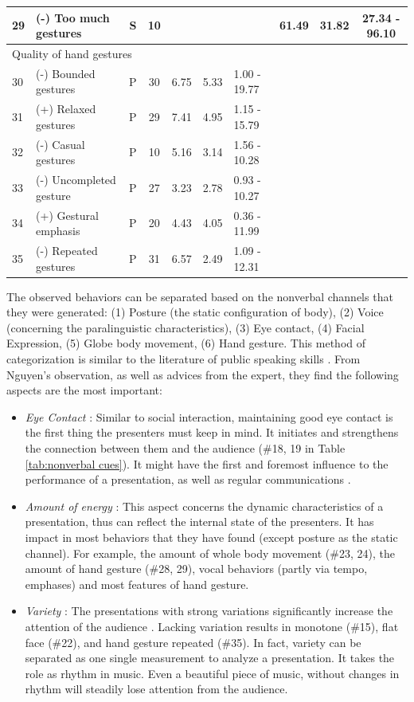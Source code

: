 \begin{table}
{\begin{tabular}{llcclllccc}
29 & (-) Too much gestures & S & 10 &  &  &  & 61.49 & 31.82 & 27.34 - 96.10 \\ \hline
\multicolumn{10}{l}{Quality of hand gestures} \\
30 & (-) Bounded gestures & P & 30 & 6.75 & 5.33 & 1.00 - 19.77 &  &  &  \\
31 & (+) Relaxed gestures & P & 29 & 7.41 & 4.95 & 1.15 - 15.79 &  &  &  \\
32 & (-) Casual gestures & P & 10 & 5.16 & 3.14 & 1.56 - 10.28 &  &  &  \\
33 & (-) Uncompleted gesture & P & 27 & 3.23 & 2.78 & 0.93 - 10.27 &  &  &  \\
34 & (+) Gestural emphasis & P & 20 & 4.43 & 4.05 & 0.36 - 11.99 &  &  &  \\
35 & (-) Repeated gestures & P & 31 & 6.57 & 2.49 & 1.09 - 12.31 &  &  &  \\ \hline
\end{tabular}%
}
\end{table}
\newpage
\par The observed behaviors can be separated based on the nonverbal channels that they were generated: (1) Posture (the static configuration of body), (2) Voice (concerning the paralinguistic characteristics), (3) Eye contact, (4) Facial Expression, (5) Globe body movement, (6) Hand gesture. This method of categorization is similar to the literature of public speaking skills \cite{rodman1996style}. From Nguyen's observation, as well as advices from the expert, they find the following aspects are the most important:

\begin{itemize}
  \item \textit{Eye Contact} : Similar to social interaction, maintaining good eye contact is the first thing the presenters must keep in mind. It initiates and strengthens the connection between them and the audience (\#18, 19 in Table \ref{tab:nonverbal cues}). It might have the first and foremost influence to the performance of a presentation, as well as regular communications \cite{Zimmerman2009}.
  \item \textit{Amount of energy} : This aspect concerns the dynamic characteristics of a presentation, thus can reflect the internal state of the presenters. It has impact in most behaviors that they have found (except posture as the static channel). For example, the amount of whole body movement (\#23, 24), the amount of hand gesture (\#28, 29), vocal behaviors (partly via tempo, emphases) and most features of hand gesture.
  \item \textit{Variety} : The presentations with strong variations significantly increase the attention of the audience \cite{nguyen2015intelligent}. Lacking variation results in monotone (\#15), flat face (\#22), and hand gesture repeated (\#35). In fact, variety can be separated as one single measurement to analyze a presentation. It takes the role as rhythm in music. Even a beautiful piece of music, without changes in rhythm will steadily lose attention from the audience.  

\end{itemize}

